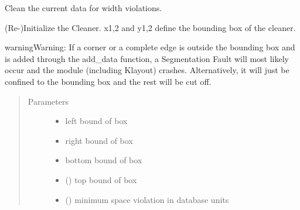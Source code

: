 \documentclass[a4paper,10pt,english]{sphinxmanual}
\begin{document}
\begin{fulllineitems}
\begin{fulllineitems}
\label{\detokenize{drc/drc:kppc.drc.kppc.drc.slcleaner.PyDrcSl.clean_width}}
Clean the current data for width violations.

\end{fulllineitems}


\begin{fulllineitems}
\label{\detokenize{drc/drc:kppc.drc.kppc.drc.slcleaner.PyDrcSl.init_list}}
(Re-)Initialize the Cleaner. x1,2 and y1,2 define the bounding box of the cleaner.

\begin{sphinxadmonition}{warning}{Warning:}
If a corner or a complete edge is outside the bounding box and is added through the add\_data function, a Segmentation Fault will most likely occur and the module (including Klayout) crashes. Alternatively, it will just be confined to the bounding box and the rest will be cut off.
\end{sphinxadmonition}
\begin{quote}\begin{description}
\item[{Parameters}] \leavevmode\begin{itemize}
\item {} 
 \textendash{} left bound of box

\item {} 
 \textendash{} right bound of box

\item {} 
 \textendash{} bottom bound of box

\item {} 
 () \textendash{} top bound of box

\item {} 
 () \textendash{} minimum space violation in database units


\end{itemize}
\end{description}
\end{quote}
\end{fulllineitems}
\end{fulllineitems}
\end{document}
